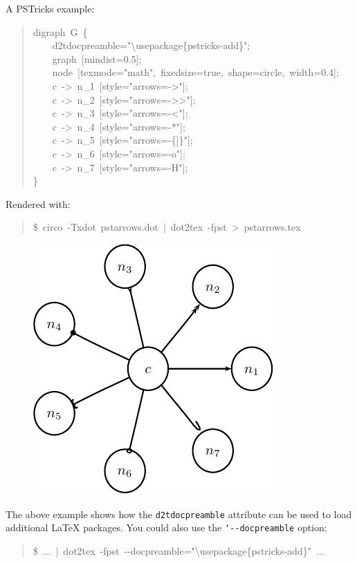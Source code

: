 \documentclass[10pt,a4paper,english]{article}
\begin{document}
A PSTricks example:
\begin{quote}{\ttfamily \raggedright \noindent
digraph~G~{\{}~\\
~~~~d2tdocpreamble="{\textbackslash}usepackage{\{}pstricks-add{\}}";~\\
~~~~graph~{[}mindist=0.5{]};~\\
~~~~node~{[}texmode="math",~fixedsize=true,~shape=circle,~width=0.4{]};~\\
~~~~c~->~n{\_}1~{[}style="arrows=->"{]};~\\
~~~~c~->~n{\_}2~{[}style="arrows=->{}>"{]};~\\
~~~~c~->~n{\_}3~{[}style="arrows=-<"{]};~\\
~~~~c~->~n{\_}4~{[}style="arrows=-*"{]};~\\
~~~~c~->~n{\_}5~{[}style="arrows=-{\{}{]}{\}}"{]};~\\
~~~~c~->~n{\_}6~{[}style="arrows=-o"{]};~\\
~~~~c~->~n{\_}7~{[}style="arrows=-H"{]};~\\
{\}}
}\end{quote}

Rendered with:
\begin{quote}{\ttfamily \raggedright \noindent
{\$}~circo~-Txdot~pstarrows.dot~|~dot2tex~-fpst~>~pstarrows.tex
}\end{quote}
\begin{figure}[H]
\centering

\includegraphics{pdf/pstarrows}
\end{figure}

The above example shows how the \texttt{d2tdocpreamble} attribute can be used to load additional LaTeX packages. You could also use the \texttt{`-{}-docpreamble} option:
\begin{quote}{\ttfamily \raggedright \noindent
{\$}~...~|~dot2tex~-fpst~-{}-docpreamble="{\textbackslash}usepackage{\{}pstricks-add{\}}"~...
}\end{quote}
\end{document}
